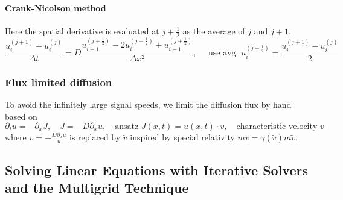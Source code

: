 \paragraph*{Crank-Nicolson method} Here the spatial derivative is
evaluated at $j+\frac{1}{2}$ as the average of $j$ and $j+1$.
\begin{equation}
    \frac{u_i^{(j+1)}-u_i^{(j)}}{\Delta t}=D \frac{u_{i+1}^{\left(j+\frac{1}{2}\right)}-2 u_i^{\left(j+\frac{1}{2}\right)}+u_{i-1}^{\left(j+\frac{1}{2}\right)}}{\Delta x^2}, \quad \text { use avg. } u_i^{\left(j+\frac{1}{2}\right)}=\frac{u_i^{(j+1)}+u_i^{(j)}}{2}
\end{equation}

\subsubsection*{Flux limited diffusion}
To avoid the infinitely large signal speeds, we limit the diffusion flux by hand
based on
\begin{equation}
    \partial_t u = - \partial_x J, \quad J = - D \partial_x u, \quad \text{ansatz } J(x,t) = u(x,t) \cdot v, \quad \text{characteristic velocity } v
\end{equation}
where $v=-\frac{D \partial_x u}{u}$ is replaced by $\tilde{v}$ inspired by special relativity
$mv = \gamma(\tilde{v})m\tilde{v}$.

\subsection*{Solving Linear Equations with Iterative Solvers and the
Multigrid Technique}
